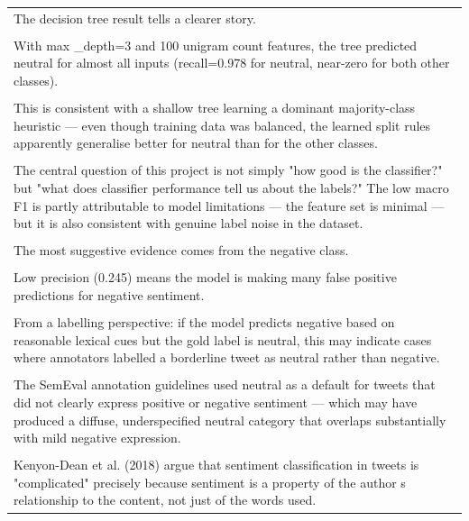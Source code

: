 \documentclass[11pt]{article}
\begin{document}
\begin{longtable}{|p{\dimexpr\linewidth-2\tabcolsep-2\arrayrulewidth\relax}|}
\hline
\rule{0pt}{3.5cm} \\
\hline
The decision tree result tells a clearer story. \\[2pt]
\hline
\rule{0pt}{3.5cm} \\
\hline
With max \_depth=3 and 100 unigram count features, the tree predicted neutral for almost all inputs (recall=0.978 for neutral, near-zero for both other classes). \\[2pt]
\hline
\rule{0pt}{3.5cm} \\
\hline
This is consistent with a shallow tree learning a dominant majority-class heuristic --- even though training data was balanced, the learned split rules apparently generalise better for neutral than for the other classes. \\[2pt]
\hline
\rule{0pt}{3.5cm} \\
\hline
The central question of this project is not simply "how good is the classifier?" but "what does classifier performance tell us about the labels?" The low macro F1 is partly attributable to model limitations --- the feature set is minimal --- but it is also consistent with genuine label noise in the dataset. \\[2pt]
\hline
\rule{0pt}{3.5cm} \\
\hline
The most suggestive evidence comes from the negative class. \\[2pt]
\hline
\rule{0pt}{3.5cm} \\
\hline
Low precision (0.245) means the model is making many false positive predictions for negative sentiment. \\[2pt]
\hline
\rule{0pt}{3.5cm} \\
\hline
From a labelling perspective: if the model predicts negative based on reasonable lexical cues but the gold label is neutral, this may indicate cases where annotators labelled a borderline tweet as neutral rather than negative. \\[2pt]
\hline
\rule{0pt}{3.5cm} \\
\hline
The SemEval annotation guidelines used neutral as a default for tweets that did not clearly express positive or negative sentiment --- which may have produced a diffuse, underspecified neutral category that overlaps substantially with mild negative expression. \\[2pt]
\hline
\rule{0pt}{3.5cm} \\
\hline
Kenyon-Dean et al. (2018) argue that sentiment classification in tweets is "complicated" precisely because sentiment is a property of the author s relationship to the content, not just of the words used. \\[2pt]

\end{longtable}
\end{document}
